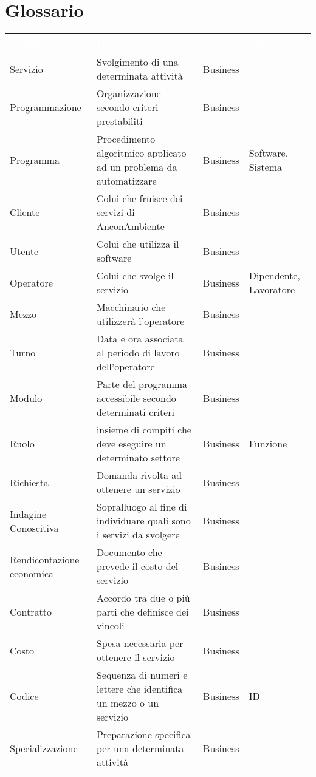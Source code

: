 \documentclass[green, fancy, 11pt]{elegantbook}
\begin{document}
\section{Glossario}
{
	\begin{tabular}{|p{}|p{6cm}|l|p{4cm}|}
	\hline
	\rowcolor{DarkGreen}
	\textbf{\textcolor{white}{Termine}} & \textbf{\textcolor{white}{Descrizione}} & \textbf{\textcolor{white}{Tipo}} & \textbf{\textcolor{white}{Sinonimo}}\\
	\hline
	Servizio & Svolgimento di una determinata attività & Business & \\
	\hline
	Programmazione &Organizzazione secondo criteri prestabiliti &Business&\\
	\hline
	Programma & Procedimento algoritmico applicato ad un problema da automatizzare & Business & Software, Sistema\\
	\hline
	Cliente &Colui che fruisce dei servizi di AnconAmbiente &Business&\\
	\hline
	Utente & Colui che utilizza il software&Business&\\
	\hline
	Operatore & Colui che svolge il servizio& Business& Dipendente, Lavoratore\\
	\hline
	Mezzo & Macchinario che utilizzerà l'operatore&Business&\\
	\hline
	Turno & Data e ora associata al periodo di lavoro dell'operatore&Business&\\
	\hline
	Modulo&Parte del programma accessibile secondo determinati criteri&Business&\\
	\hline
	Ruolo &insieme di compiti che deve eseguire un determinato settore &Business& Funzione\\
	\hline
	Richiesta &Domanda rivolta ad ottenere un servizio& Business &\\
	\hline
	Indagine Conoscitiva &Sopralluogo al fine di individuare quali sono i servizi da svolgere &Business&\\ 
	\hline
	Rendicontazione economica& Documento che prevede il costo del servizio &Business&\\
	\hline
	Contratto &Accordo tra due o più parti che definisce dei vincoli &Business&\\
	\hline
	Costo & Spesa necessaria per ottenere il servizio &Business&\\
	\hline
	Codice & Sequenza di numeri e lettere che identifica un mezzo o un servizio &Business&ID\\ 
	\hline
	Specializzazione &Preparazione specifica per una determinata attività &Business& \\

\end{tabular}}
\end{document}
